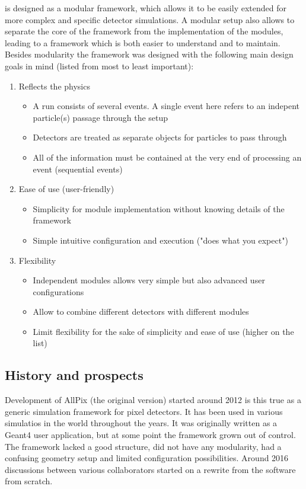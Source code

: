 \apsq is designed as a modular framework, which allows it to be easily extended for more complex and specific detector simulations. A modular setup also allows to separate the core of the framework from the implementation of the modules, leading to a framework which is both easier to understand and to maintain. Besides modularity the \apsq framework was designed with the following main design goals in mind (listed from most to least important):
\begin{enumerate}
    \item Reflects the physics
    \begin{itemize}
        \item A run consists of several events. A single event here refers to an indepent particle(s) passage through the setup
        \item Detectors are treated as separate objects for particles to pass through
        \item All of the information must be contained at the very end of processing an event (sequential events)
    \end{itemize}
    \item Ease of use (user-friendly)
    \begin{itemize}
        \item Simplicity for module implementation without knowing details of the framework
        \item Simple intuitive configuration and execution ("does what you expect")
    \end{itemize}
    \item Flexibility
    \begin{itemize}
        \item Independent modules allows very simple but also advanced user configurations
        \item Allow to combine different detectors with different modules
        \item Limit flexibility for the sake of simplicity and ease of use (higher on the list)
    \end{itemize}
\end{enumerate}

\subsection{History and prospects}
Development of AllPix (the original version) started around 2012 \todo is this true \todo as a generic simulation framework for pixel detectors. It has been used in various simulatios in the world throughout the years. It was originally written as a Geant4 user application, but at some point the framework grown out of control. The framework lacked a good structure, did not have any modularity, had a confusing geometry setup and limited configuration possibilities. Around 2016 discussions between various collaborators started on a rewrite from the software from scratch. 

